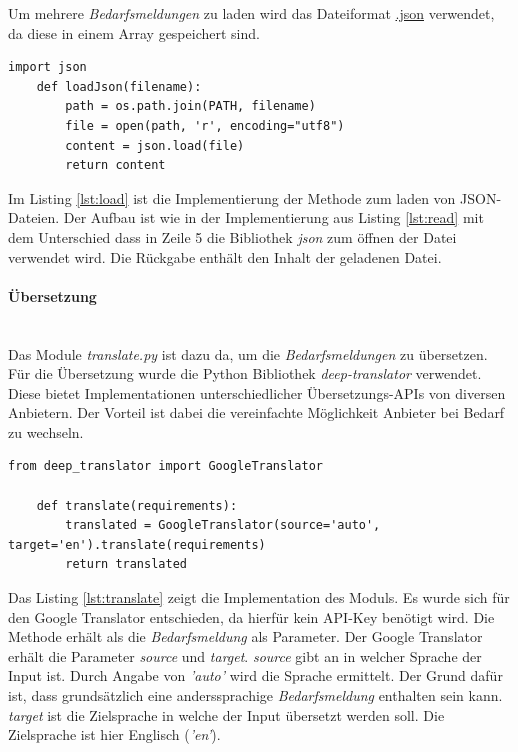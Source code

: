 Um mehrere \emph{Bedarfsmeldungen} zu laden wird das Dateiformat \url{.json} verwendet, da diese in einem Array gespeichert sind.
\begin{lstlisting}[caption={Implementation der Methode loadJson() des Moduls \emph{readRequirements.py}}, label=lst:load]
	import json
	def loadJson(filename):
		path = os.path.join(PATH, filename)
		file = open(path, 'r', encoding="utf8")
		content = json.load(file)
		return content
\end{lstlisting}
Im Listing \ref{lst:load} ist die Implementierung der Methode zum laden von JSON-Dateien. Der Aufbau ist wie in der Implementierung aus Listing \ref{lst:read} mit dem Unterschied dass in Zeile 5 die Bibliothek \emph{json} zum öffnen der Datei verwendet wird. Die Rückgabe enthält den Inhalt der geladenen Datei.
\paragraph{Übersetzung}\mbox{}\\
Das Module \emph{translate.py} ist dazu da, um die \emph{Bedarfsmeldungen} zu übersetzen. Für die Übersetzung wurde die Python Bibliothek \emph{deep-translator} verwendet. Diese bietet Implementationen unterschiedlicher Übersetzungs-APIs von diversen Anbietern. Der Vorteil ist dabei die vereinfachte Möglichkeit Anbieter bei Bedarf zu wechseln.
\begin{lstlisting}[caption={Implementation des Moduls \emph{translate.py}}, label=lst:translate]
	from deep_translator import GoogleTranslator
	
	def translate(requirements):
		translated = GoogleTranslator(source='auto', target='en').translate(requirements)
		return translated
\end{lstlisting}
Das Listing \ref{lst:translate} zeigt die Implementation des Moduls. Es wurde sich für den Google Translator entschieden, da hierfür kein API-Key benötigt wird. Die Methode erhält als die \emph{Bedarfsmeldung} als Parameter. Der Google Translator erhält die Parameter \emph{source} und \emph{target}. \emph{source} gibt an in welcher Sprache der Input ist. Durch Angabe von \emph{'auto'} wird die Sprache ermittelt. Der Grund dafür ist, dass grundsätzlich eine anderssprachige \emph{Bedarfsmeldung} enthalten sein kann. \emph{target} ist die Zielsprache in welche der Input übersetzt werden soll. Die Zielsprache ist hier Englisch (\emph{'en'}).
